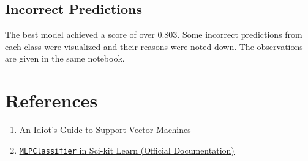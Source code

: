 \documentclass[12pt]{article}
\begin{document}
    \subsection*{Incorrect Predictions}
    The best model achieved a score of over 0.803. Some incorrect predictions from each class
    were visualized and their reasons were noted down. The observations are given in the
    same notebook.

    \section*{References}
    \begin{enumerate}
        \item \href{https://web.mit.edu/6.034/wwwbob/svm-notes-long-08.pdf}{\color{blue}\underline{An Idiot's Guide to Support Vector Machines}}
        \item \href{https://scikit-learn.org/stable/modules/generated/sklearn.neural_network.MLPClassifier.html}{\color{blue}\underline{\texttt{MLPClassifier} in Sci-kit Learn (Official Documentation)}}
    \end{enumerate}









    
\end{document}
